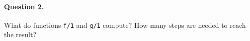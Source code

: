 
\paragraph{Question 2.}

What do functions \texttt{f/1} and \texttt{g/1} compute? How many
steps are needed to reach the result?

